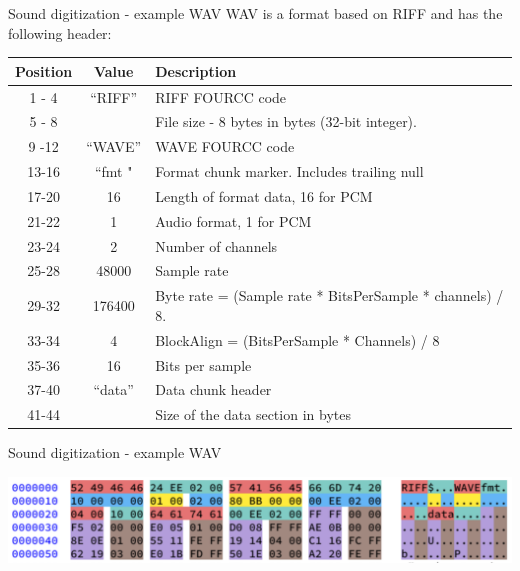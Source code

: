 \begin{frame}{Sound digitization - example WAV}
  WAV is a format based on RIFF and has the following header:
  \begin{center}
  \fontsize{8}{9}\selectfont
  \begin{tabularx}{13cm}{c|c|X}
    Position & Value & Description \\
    \hline
    1 - 4 & “RIFF” & RIFF FOURCC code \\
    5 - 8 &  & File size - 8 bytes in bytes (32-bit integer). \\
    9 -12 & “WAVE” & WAVE FOURCC code \\
    13-16 & “fmt " & Format chunk marker. Includes trailing null \\
    17-20 & 16 & Length of format data, 16 for PCM \\
    21-22 & 1 & Audio format, 1 for PCM \\
    23-24 & 2 & Number of channels \\
    25-28 & 48000 & Sample rate \\
    29-32 & 176400 & Byte rate = (Sample rate * BitsPerSample * channels) / 8. \\
    33-34 & 4 & BlockAlign = (BitsPerSample * Channels) / 8 \\
    35-36 & 16 & Bits per sample \\
    37-40 & “data” & Data chunk header \\
    41-44 &  & Size of the data section in bytes \\
  \end{tabularx}
  \end{center}
\end{frame}

\begin{frame}{Sound digitization - example WAV}
  \begin{center}
  \includegraphics[width=\textwidth]{slides/audio-sound/RIFF_WAVE.png}
  \end{center}
\end{frame}


